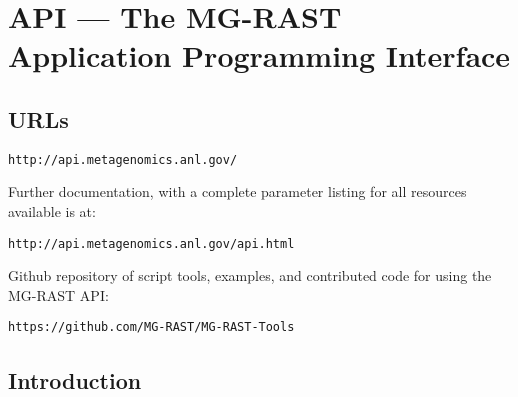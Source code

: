\chapter{API --- The MG-RAST Application Programming Interface}
\label{API}

% 

\section{URLs}
\begin{small}
\begin{verbatim}
http://api.metagenomics.anl.gov/
\end{verbatim}
\end{small} Further documentation, with a complete parameter listing for all resources available is at:
\begin{small}
\begin{verbatim}
http://api.metagenomics.anl.gov/api.html
\end{verbatim}
\end{small} Github repository of script tools, examples, and contributed code for using the MG-RAST API:
\begin{small}
\begin{verbatim}
https://github.com/MG-RAST/MG-RAST-Tools
\end{verbatim}
\end{small}
\section{Introduction}

